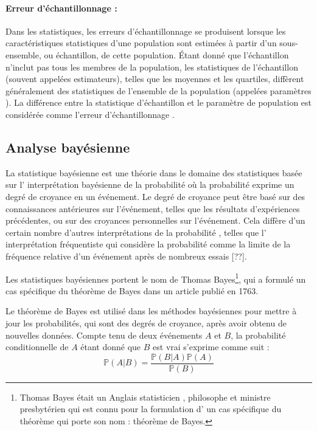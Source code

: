 	\paragraph*{Erreur d'échantillonnage :}
	Dans les statistiques, les erreurs d'échantillonnage se produisent lorsque les caractéristiques statistiques d'une population sont estimées à partir d'un sous-ensemble, ou échantillon, de cette population. Étant donné que l'échantillon n'inclut pas tous les membres de la population, les statistiques de l'échantillon (souvent appelées estimateurs), telles que les moyennes et les quartiles, diffèrent généralement des statistiques de l'ensemble de la population (appelées paramètres ). La différence entre la statistique d'échantillon et le paramètre de population est considérée comme l'erreur d'échantillonnage \cite{sarndal2003model}. 
	
	
	
		
	\subsection{Analyse bayésienne}
		La statistique bayésienne est une théorie dans le domaine des statistiques basée sur l' interprétation bayésienne de la probabilité où la probabilité exprime un degré de croyance en un événement. Le degré de croyance peut être basé sur des connaissances antérieures sur l'événement, telles que les résultats d'expériences précédentes, ou sur des croyances personnelles sur l'événement. Cela diffère d'un certain nombre d'autres interprétations de la probabilité , telles que l' interprétation fréquentiste qui considère la probabilité comme la limite de la fréquence relative d'un événement après de nombreux essais [??].
		
		Les statistiques bayésiennes portent le nom de Thomas Bayes\footnote{Thomas Bayes était un Anglais statisticien , philosophe et ministre presbytérien qui est connu pour la formulation d' un cas spécifique du théorème qui porte son nom : théorème de Bayes.}, qui a formulé un cas spécifique du théorème de Bayes dans un article publié en 1763.
		
		
		
		\begin{thm} Le théorème de Bayes est utilisé dans les méthodes bayésiennes pour mettre à jour les probabilités, qui sont des degrés de croyance, après avoir obtenu de nouvelles données. Compte tenu de deux événements $A$  et $B$, la probabilité conditionnelle de $A$ étant donné que $B$ est vrai s'exprime comme suit  :
			\begin{equation}
				\mathbb{P}(A|B) = \frac{\mathbb{P}(B|A) \mathbb{P}(A)}{\mathbb{P}(B)}
			\end{equation}
			
		\end{thm}
	
